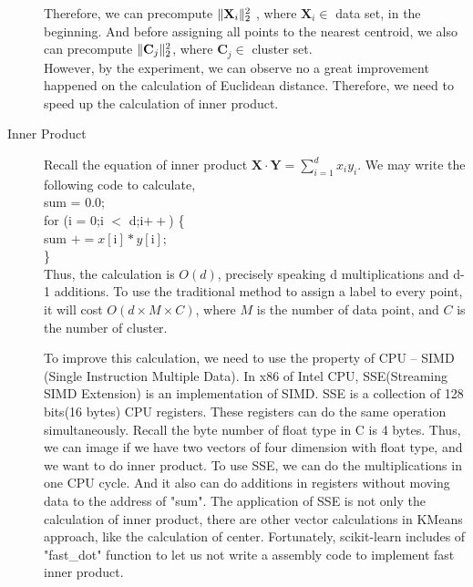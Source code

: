 \documentclass[final,leqno,onefignum,onetabnum]{siamltexmm}
\DeclarePairedDelimiter\norm{\lVert}{\rVert}%
\begin{document}
\begin{description}
Therefore, we can precompute $\norm{\textbf{X}_i}_2^2$ , where $\textbf{X}_i \in$ data set,  in the beginning. 
And before assigning all points to the nearest centroid, we also can precompute $\norm{\textbf{C}_j}_2^2$, where $\textbf{C}_j \in$ cluster set. \\

However, by the experiment, we can observe no a great improvement happened on the calculation of Euclidean distance. Therefore, we need to speed up the calculation of inner product.

\item[Inner Product]

Recall the equation of inner product $\textbf{X} \cdot \textbf{Y} = \sum_{i=1}^{d} x_i y_i$. We may write the following code to calculate, \\
sum = 0.0; \\
for (i = 0;i $<$ d;i$++$) \{ \\
sum $+= x[\text{i}] * y[\text{i}]$; \\
\} \\

Thus, the calculation is $O(d)$, precisely speaking d multiplications and d-1 additions. To use the traditional method to assign a label to every point, it will cost $O(d \times M \times C)$, where $M$ is the number of data point, and $C$ is the number of cluster.

To improve this calculation, we need to use the property of CPU -- SIMD (Single Instruction Multiple Data). In x86 of Intel CPU, SSE(Streaming SIMD Extension) is an implementation of SIMD. SSE is a collection of 128 bits(16 bytes) CPU registers. These registers can do the same operation simultaneously. Recall the byte number of float type in C is 4 bytes. Thus, we can image if we have two vectors of four dimension with float type, and we want to do inner product. To use SSE, we can do the multiplications in one CPU cycle. And it also can do additions in registers without moving data to the address of "sum". The application of SSE is not only the calculation of inner product, there are other vector calculations in KMeans approach, like the calculation of center. Fortunately, scikit-learn includes of "fast\_dot" function to let us not write a assembly code to implement fast inner product.
\begin{verbatim}










\end{verbatim}
\end{description}
\end{document}
